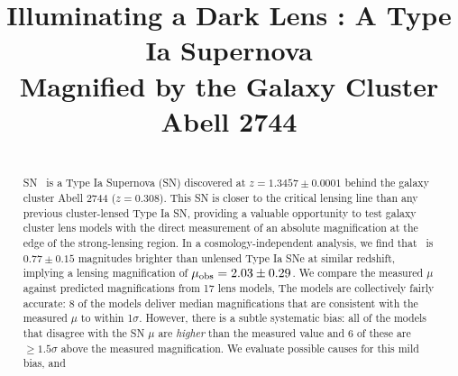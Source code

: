 







\title{Illuminating a Dark Lens : A Type Ia Supernova \\ Magnified by the Galaxy Cluster Abell 2744}




\begin{abstract}
\\
SN \tomas\ is a Type Ia Supernova (SN) discovered at
$z=1.3457\pm0.0001$ behind the galaxy cluster Abell 2744
($z=0.308$). This SN 
is closer to the critical lensing line than any
previous cluster-lensed Type Ia SN, 
providing a valuable
opportunity to test galaxy cluster lens models
with the direct measurement of an absolute magnification at the edge
of the strong-lensing region.  
In a cosmology-independent analysis, we find that \tomas\ is
$0.77\pm0.15$ magnitudes brighter than unlensed Type Ia SNe at similar
redshift, implying a lensing magnification of 
$\mu_{\rm obs}=2.03\pm0.29$. 
  We compare the measured $\mu$
against predicted magnifications from 17 lens models,   The models are collectively
fairly accurate: 8 of the models deliver median magnifications that
are consistent with the measured $\mu$ to within 1$\sigma$.  However,
there is a subtle systematic bias: all of the models that disagree
with the SN $\mu$
are {\it higher} than the measured value and 6 of these
are $\geq1.5\sigma$ above the measured magnification.  We
evaluate possible causes for this mild bias,
and 
\end{abstract}

